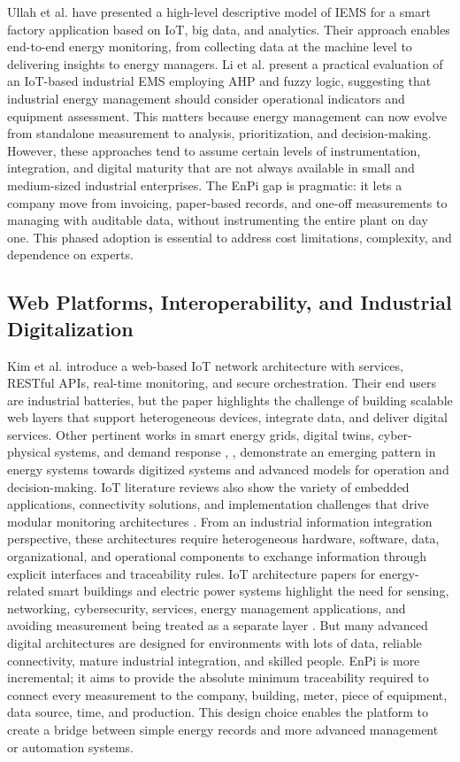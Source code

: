 \documentclass[technologies,article,submit,pdftex,moreauthors]{Definitions/mdpi}
\begin{document}
Ullah et al. \cite{ref2} have presented a high-level descriptive model of IEMS for a smart factory application based on IoT, big data, and analytics. Their approach enables end-to-end energy monitoring, from collecting data at the machine level to delivering insights to energy managers. Li et al. \cite{ref3} present a practical evaluation of an IoT-based industrial EMS employing AHP and fuzzy logic, suggesting that industrial energy management should consider operational indicators and equipment assessment. This matters because energy management can now evolve from standalone measurement to analysis, prioritization, and decision-making. However, these approaches tend to assume certain levels of instrumentation, integration, and digital maturity that are not always available in small and medium-sized industrial enterprises. The EnPi gap is pragmatic: it lets a company move from invoicing, paper-based records, and one-off measurements to managing with auditable data, without instrumenting the entire plant on day one. This phased adoption is essential to address cost limitations, complexity, and dependence on experts. 

\subsection{Web Platforms, Interoperability, and Industrial Digitalization}
\label{subsec:web-platforms}
Kim et al. \cite{ref5} introduce a web-based IoT network architecture with services, RESTful APIs, real-time monitoring, and secure orchestration. Their end users are industrial batteries, but the paper highlights the challenge of building scalable web layers that support heterogeneous devices, integrate data, and deliver digital services. Other pertinent works in smart energy grids, digital twins, cyber-physical systems, and demand response \cite{ref6}, \cite{ref10}, \cite{ref11} demonstrate an emerging pattern in energy systems towards digitized systems and advanced models for operation and decision-making. IoT literature reviews also show the variety of embedded applications, connectivity solutions, and implementation challenges that drive modular monitoring architectures \cite{ref12,ref13}. From an industrial information integration perspective, these architectures require heterogeneous hardware, software, data, organizational, and operational components to exchange information through explicit interfaces and traceability rules. IoT architecture papers for energy-related smart buildings and electric power systems highlight the need for sensing, networking, cybersecurity, services, energy management 
applications, and avoiding measurement being treated as a separate layer \cite{ref27,ref28}. But many advanced digital architectures are designed for environments with lots of data, reliable connectivity, mature industrial integration, and skilled people. EnPi is more incremental; it aims to provide the absolute minimum traceability required to connect every measurement to the company, building, meter, piece of equipment, data source, time, and production. This design choice enables the platform to create a bridge between simple energy records and more advanced management or automation systems. 
\end{document}
